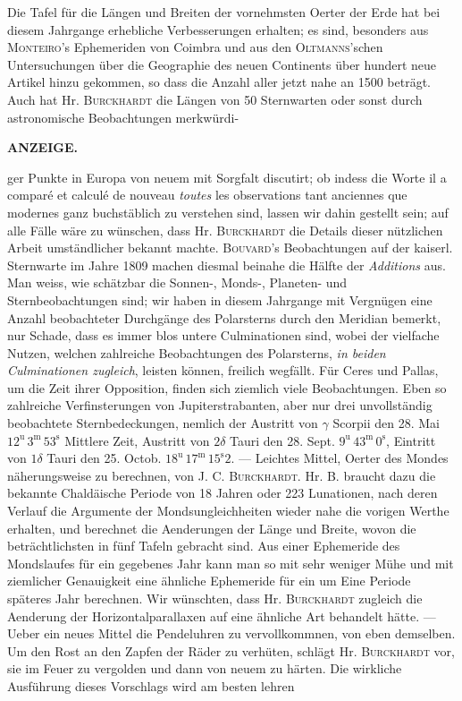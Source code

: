 Die Tafel für die Längen und Breiten der vornehmsten Oerter der Erde hat bei diesem Jahrgange erhebliche Verbesserungen erhalten; es sind, besonders aus \textsc{Monteiro}'s Ephemeriden von Coimbra und aus den \textsc{Oltmanns}'schen Untersuchungen über die Geographie des neuen Continents über hundert neue Artikel hinzu gekommen, so dass die Anzahl aller jetzt nahe an 1500 beträgt. Auch hat Hr. \textsc{Burckhardt} die Längen von 50 Sternwarten oder sonst durch astronomische Beobachtungen merkwürdi-\par
{}
\clearpage
\noindent{}%
%
\parbox[t]{\dimexpr\linewidth-24mm\relax}{\centering\footnotesize\bfseries ANZEIGE.\par}%
\makebox[12mm][r]{}\par\nobreak\medskip
\noindent ger Punkte in Europa von neuem mit Sorgfalt discutirt; ob indess die Worte il a comparé et calculé de nouveau \emph{toutes} les observations tant anciennes que modernes ganz buchstäblich zu verstehen sind, lassen wir dahin gestellt sein; auf alle Fälle wäre zu wünschen, dass Hr. \textsc{Burckhardt} die Details dieser nützlichen Arbeit umständlicher bekannt machte. \textsc{Bouvard}'s Beobachtungen auf der kaiserl. Sternwarte im Jahre 1809 machen diesmal beinahe die Hälfte der \emph{Additions} aus. Man weiss, wie schätzbar die Sonnen-, Monds-, Planeten- und Sternbeobachtungen sind; wir haben in diesem Jahrgange mit Vergnügen eine Anzahl beobachteter Durchgänge des Polarsterns durch den Meridian bemerkt, nur Schade, dass es immer blos untere Culminationen sind, wobei der vielfache Nutzen, welchen zahlreiche Beobachtungen des Polarsterns, \emph{in beiden Culminationen zugleich}, leisten können, freilich wegfällt. Für Ceres und Pallas, um die Zeit ihrer Opposition, finden sich ziemlich viele Beobachtungen. Eben so zahlreiche Verfinsterungen von Jupiterstrabanten, aber nur drei unvollständig beobachtete Sternbedeckungen, nemlich der Austritt von $\gamma$ Scorpii den 28. Mai $12^{\mathrm u}\,3^{\mathrm m}\,53^{\mathrm s}$ Mittlere Zeit, Austritt von $2\delta$ Tauri den 28. Sept. $9^{\mathrm u}\,43^{\mathrm m}\,0^{\mathrm s}$, Eintritt von $1\delta$ Tauri den 25. Octob. $18^{\mathrm u}\,17^{\mathrm m}\,15^{\mathrm s}2$. --- Leichtes Mittel, Oerter des Mondes näherungsweise zu berechnen, von J. C. \textsc{Burckhardt}. Hr. B. braucht dazu die bekannte Chaldäische Periode von 18 Jahren oder 223 Lunationen, nach deren Verlauf die Argumente der Mondsungleichheiten wieder nahe die vorigen Werthe erhalten, und berechnet die Aenderungen der Länge und Breite, wovon die beträchtlichsten in fünf Tafeln gebracht sind. Aus einer Ephemeride des Mondslaufes für ein gegebenes Jahr kann man so mit sehr weniger Mühe und mit ziemlicher Genauigkeit eine ähnliche Ephemeride für ein um Eine Periode späteres Jahr berechnen. Wir wünschten, dass Hr. \textsc{Burckhardt} zugleich die Aenderung der Horizontalparallaxen auf eine ähnliche Art behandelt hätte. --- Ueber ein neues Mittel die Pendeluhren zu vervollkommnen, von eben demselben. Um den Rost an den Zapfen der Räder zu verhüten, schlägt Hr. \textsc{Burckhardt} vor, sie im Feuer zu vergolden und dann von neuem zu härten. Die wirkliche Ausführung dieses Vorschlags wird am besten lehren 